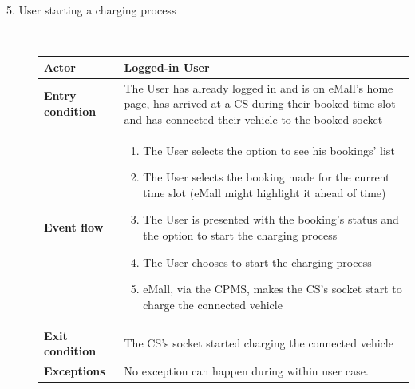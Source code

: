 \documentclass[11pt]{article}
\begin{document}
\begin{description}
    \item [5. User starting a charging process] \hfill \\
    \begin{table}[H]
        \centering
        \setlength{\tabcolsep}{18pt}
        \renewcommand{\arraystretch}{1.4}
        \begin{tabularx}{\textwidth}{|>{\hsize=0.5\hsize}X|>{\hsize=1.5\hsize}X|}
            \hline
            \textbf{Actor} & Logged-in User \\
            \hline
            \textbf{Entry condition} & The User has already logged in and is on eMall's home page, has arrived at a CS during their booked time slot and has connected their vehicle to the booked socket \\
            \hline
            \textbf{Event flow} & 
                \begin{minipage}[t]{\hsize}
                \begin{enumerate}[topsep=0pt, leftmargin=*]
                    \item The User selects the option to see his bookings' list
                    \item The User selects the booking made for the current time slot (eMall might highlight it ahead of time)
                    \item The User is presented with the booking's status and the option to start the charging process
                    \item The User chooses to start the charging process
                    \item eMall, via the CPMS, makes the CS's socket start to charge the connected vehicle
                \end{enumerate}
                \end{minipage}
                \vspace{6pt}
            \\
            \hline
            \textbf{Exit condition} & The CS's socket started charging the connected vehicle \\
            \hline
            \textbf{Exceptions} & No exception can happen during within user case. \\
            \hline
        \end{tabularx}
    \end{table}
    

\end{description}
\end{document}

